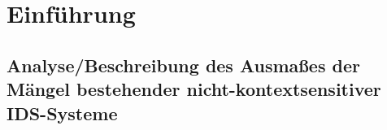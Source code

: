 
\chapter{Einführung}
\label{cha:introduction}


\section{Analyse/Beschreibung des Ausmaßes der Mängel bestehender nicht-kontextsensitiver IDS-Systeme}
